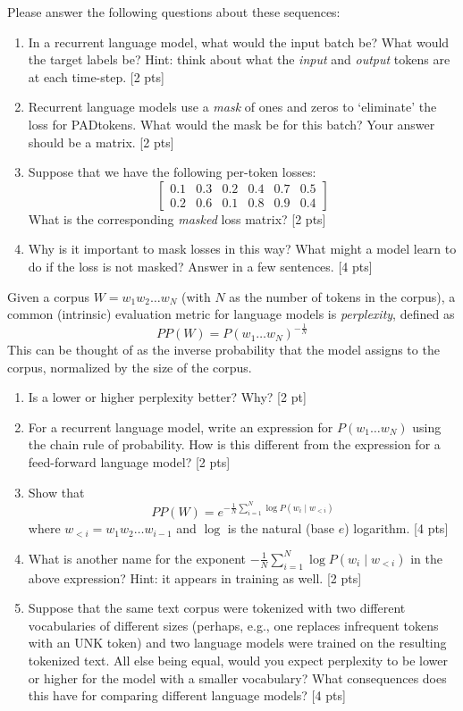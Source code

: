 \documentclass[11pt]{article}
\newcommand{\pad}{PAD\:}
\begin{document}
Please answer the following questions about these sequences:
\begin{enumerate}[label=\alph*.]
  \item In a recurrent language model, what would the input batch be? What would the target labels be? Hint: think about what the \textit{input} and \textit{output} tokens are at each time-step. [2 pts]
  \item Recurrent language models use a \emph{mask} of ones and zeros to `eliminate' the loss for \pad tokens. What would the mask be for this batch? Your answer should be a matrix. [2 pts]
  \item Suppose that we have the following per-token losses:
    \[\begin{bmatrix}
      0.1 & 0.3 & 0.2 & 0.4 & 0.7 & 0.5 \\
      0.2 & 0.6 & 0.1 & 0.8 & 0.9 & 0.4
    \end{bmatrix}\]
    What is the corresponding \emph{masked} loss matrix? [2 pts]
  \item Why is it important to mask losses in this way?  What might a model learn to do if the loss is not masked? Answer in a few sentences. [4 pts]
\end{enumerate}

\vspace{2em}
 Given a corpus $W = w_1 w_2 \dots w_N$ (with $N$ as the number of tokens in the corpus), a common (intrinsic) evaluation metric for language models is \emph{perplexity}, defined as
\[ PP(W) = P(w_1 \dots w_N)^{-\frac{1}{N}} \]
This can be thought of as the inverse probability that the model assigns to the corpus, normalized by the size of the corpus.

\begin{enumerate}[label=\alph*.]
  \item Is a lower or higher perplexity better? Why? [2 pt]
  \item For a recurrent language model, write an expression for $P(w_1 \dots w_N)$ using the chain rule of probability.  How is this different from the expression for a feed-forward language model? [2 pts]
  \item Show that
  \[ PP(W) = e^{-\frac{1}{N} \sum_{i=1}^N \log P(w_i \mid w_{<i})} \]
  where $w_{<i} = w_1 w_2 \dots w_{i-1}$ and $\log$ is the natural (base $e$) logarithm. [4 pts]
  \item What is another name for the exponent $-\frac{1}{N} \sum_{i=1}^N \log P(w_i \mid w_{<i})$ in the above expression? Hint: it appears in training as well. [2 pts]
  \item Suppose that the same text corpus were tokenized with two different vocabularies of different sizes (perhaps, e.g., one replaces infrequent tokens with an UNK token) and two language models were trained on the resulting tokenized text.  All else being equal, would you expect perplexity to be lower or higher for the model with a smaller vocabulary?  What consequences does this have for comparing different language models? [4 pts]
\end{enumerate}
\end{document}
